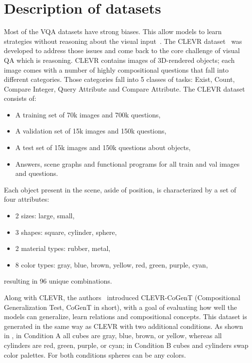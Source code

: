 \appendix

\section{Description of datasets}

Most of the VQA datasets have strong biases. This allow models to learn strategies without reasoning about the visual input~\cite{Santoro2017ASN}.
The CLEVR dataset~\cite{johnson2017clevr} was developed to address those issues and come back to the core challenge of visual QA which is reasoning.
CLEVR contains images of 3D-rendered objects; each image comes with a number of highly compositional questions that fall into different categories.
Those categories fall into 5 classes of tasks: Exist, Count, Compare Integer, Query Attribute and Compare Attribute. 
The CLEVR dataset consists of:
\begin{itemize}
\item 	A training set of 70k images and 700k questions,
\item	A validation set of 15k images and 150k questions,
\item	A test  set of 15k images and 150k questions about objects,
\item	Answers, scene graphs and functional programs for all train and val images and questions.
\end{itemize}
Each object present in the scene, aside of position, is characterized by a set of four attributes:
\begin{itemize}
\item 2 sizes: large, small,
\item 3 shapes: square, cylinder, sphere,
\item 2 material types: rubber, metal,
\item 8 color types: gray, blue, brown, yellow, red, green, purple, cyan,
\end{itemize}
resulting in 96 unique combinations.

Along with CLEVR, the authors~\cite{johnson2017clevr} introduced  CLEVR-CoGenT (Compositional Generalization Test, CoGenT in short), with a goal of evaluating how well the models can generalize, learn relations and compositional concepts.
This dataset is generated in the same way as CLEVR with two additional conditions.
As shown in , in Condition A all cubes are gray, blue, brown, or yellow, whereas all cylinders are red, green, purple, or cyan; in Condition B cubes and cylinders swap color palettes.
For both conditions spheres can be any colors.

